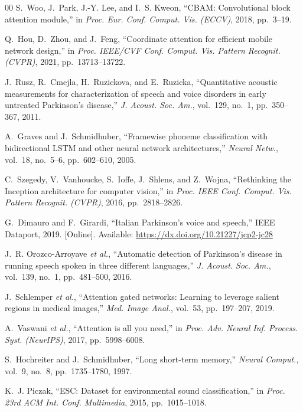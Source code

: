 \documentclass[conference]{IEEEtran}
\begin{document}
\begin{thebibliography}{00}
S.~Woo, J.~Park, J.-Y. Lee, and I.~S. Kweon, ``CBAM: Convolutional block attention module,'' in \textit{Proc. Eur. Conf. Comput. Vis. (ECCV)}, 2018, pp.~3--19.

Q.~Hou, D.~Zhou, and J.~Feng, ``Coordinate attention for efficient mobile network design,'' in \textit{Proc. IEEE/CVF Conf. Comput. Vis. Pattern Recognit. (CVPR)}, 2021, pp.~13713--13722.

J.~Rusz, R.~Cmejla, H.~Ruzickova, and E.~Ruzicka, ``Quantitative acoustic measurements for characterization of speech and voice disorders in early untreated Parkinson's disease,'' \textit{J. Acoust. Soc. Am.}, vol.~129, no.~1, pp.~350--367, 2011.

A.~Graves and J.~Schmidhuber, ``Framewise phoneme classification with bidirectional LSTM and other neural network architectures,'' \textit{Neural Netw.}, vol.~18, no.~5--6, pp.~602--610, 2005.

C.~Szegedy, V.~Vanhoucke, S.~Ioffe, J.~Shlens, and Z.~Wojna, ``Rethinking the Inception architecture for computer vision,'' in \textit{Proc. IEEE Conf. Comput. Vis. Pattern Recognit. (CVPR)}, 2016, pp.~2818--2826.

G.~Dimauro and F.~Girardi, ``Italian Parkinson's voice and speech,'' IEEE Dataport, 2019. [Online]. Available: \url{https://dx.doi.org/10.21227/jcp2-jc28}

J.~R. Orozco-Arroyave \textit{et al.}, ``Automatic detection of Parkinson's disease in running speech spoken in three different languages,'' \textit{J. Acoust. Soc. Am.}, vol.~139, no.~1, pp.~481--500, 2016.

J.~Schlemper \textit{et al.}, ``Attention gated networks: Learning to leverage salient regions in medical images,'' \textit{Med. Image Anal.}, vol.~53, pp.~197--207, 2019.

A.~Vaswani \textit{et al.}, ``Attention is all you need,'' in \textit{Proc. Adv. Neural Inf. Process. Syst. (NeurIPS)}, 2017, pp.~5998--6008.

S.~Hochreiter and J.~Schmidhuber, ``Long short-term memory,'' \textit{Neural Comput.}, vol.~9, no.~8, pp.~1735--1780, 1997.

K.~J. Piczak, ``ESC: Dataset for environmental sound classification,'' in \textit{Proc. 23rd ACM Int. Conf. Multimedia}, 2015, pp.~1015--1018.


\end{thebibliography}
\end{document}

